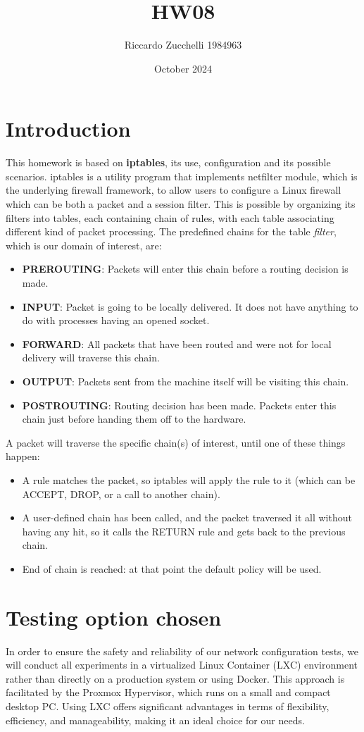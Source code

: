 \documentclass{article}
\title{HW08}
\author{Riccardo Zucchelli 1984963}
\date{October 2024}
\begin{document}
\maketitle

\section{Introduction}
This homework is based on \textbf{iptables}, its use, configuration and its possible scenarios.
iptables is a utility program that implements netfilter module, which is the underlying firewall framework, to allow users to configure a Linux firewall which can be both a packet and a session filter. This is possible by organizing its filters into tables, each containing chain of rules, with each table associating different kind of packet processing. The predefined chains for the table \textit{filter}, which is our domain of interest, are:
\begin{itemize}
    \item \textbf{PREROUTING}: Packets will enter this chain before a routing decision is made.
    \item \textbf{INPUT}: Packet is going to be locally delivered. It does not have anything to do with processes having an opened socket.
    \item \textbf{FORWARD}: All packets that have been routed and were not for local delivery will traverse this chain.
    \item \textbf{OUTPUT}: Packets sent from the machine itself will be visiting this chain.
    \item \textbf{POSTROUTING}: Routing decision has been made. Packets enter this chain just before handing them off to the hardware.
\end{itemize}
A packet will traverse the specific chain(s) of interest, until one of these things happen:
\begin{itemize}
    \item A rule matches the packet, so iptables will apply the rule to it (which can be ACCEPT, DROP, or a call to another chain).
    \item A user-defined chain has been called, and the packet traversed it all without having any hit, so it calls the RETURN rule and gets back to the previous chain.
    \item End of chain is reached: at that point the default policy will be used.
\end{itemize}

\section{Testing option chosen}
In order to ensure the safety and reliability of our network configuration tests, we will conduct all experiments in a virtualized Linux Container (LXC) environment rather than directly on a production system or using Docker. This approach is facilitated by the Proxmox Hypervisor, which runs on a small and compact desktop PC. Using LXC offers significant advantages in terms of flexibility, efficiency, and manageability, making it an ideal choice for our needs. 
\end{document}
